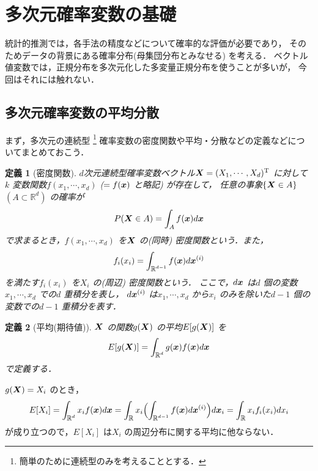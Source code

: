 \documentclass[11pt,ascmac]{jsarticle}
\newtheorem{df}{\bf 定義}[section]
\newcommand{\R}{\mbox{${\mathbb R}$}}
\newcommand{\sR}{\mbox{\footnotesize${\mathbb R}$}}
\newcommand{\vx}{\mbox{{\boldmath $x$}}}
\newcommand{\vX}{\mbox{{\boldmath $X$}}}
\begin{document}
\section{多次元確率変数の基礎}


統計的推測では，各手法の精度などについて確率的な評価が必要であり，
そのためデータの背景にある確率分布(母集団分布とみなせる) を考える．
ベクトル値変数では，正規分布を多次元化した多変量正規分布を使うことが多いが，
今回はそれには触れない．

\subsection{多次元確率変数の平均分散}

まず，多次元の連続型
\footnote{簡単のために連続型のみを考えることとする．}
確率変数の密度関数や平均・分散などの定義などについてまとめておこう．

\begin{df}[密度関数]
$d$次元連続型確率変数ベクトル$\vX = (X_1, \cdots,X_d)^{\rm T}$ に対して
$k$ 変数関数$f(x_1,\cdots, x_d)$ ($= f(\vx)$ と略記) が存在して，
任意の事象$\{\vX \in A\}$ $(A \subset \R^d)$ の確率が
\begin{equation}
P(\vX \in A) = \int_A f(\vx)d\vx
\end{equation}
で求まるとき，$f(x_1, \cdots, x_d)$ を$\vX$ の(同時) 密度関数という．また，
\begin{equation}
f_i(x_i) = \int_{\sR^{d-1}} f(\vx)d\vx^{(i)}
\end{equation}
を満たす$f_i(x_i)$ を$X_i$ の(周辺) 密度関数という．
ここで，$d\vx$ は$d$ 個の変数$x_1, \cdots, x_d$ での$d$ 重積分を表し，
$d\vx^{(i)}$ は$x_1, \cdots, x_d$ から$x_i$ のみを除いた$d-1$ 個の変数での$d-1$ 重積分を表す．
\end{df}

\begin{df}[平均(期待値)]
$\vX$ の関数$g(\vX)$ の平均$E[g(\vX)]$ を
\begin{equation}
E[g(\vX)] = \int_{\sR^d}g(\vx)f(\vx)d\vx
\end{equation}
で定義する．
\end{df}

$g(\vX) = X_i$ のとき，
\begin{equation}
E[X_i] = \int_{\sR^d}x_if(\vx)d\vx 
= \int_{\sR}x_i \Bigl(\int_{\sR^{d-1}}f(\vx)d\vx^{(i)}\Bigr)d\vx_i 
= \int_{\sR}x_if_i(x_i)dx_i
\end{equation}
が成り立つので，$E[X_i]$ は$X_i$ の周辺分布に関する平均に他ならない．
\end{document}
